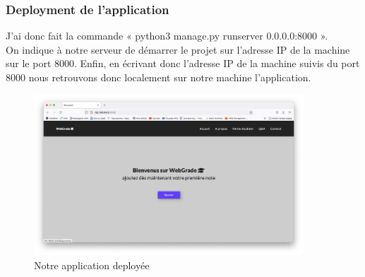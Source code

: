 \documentclass[12pt, a4paper]{article}
\begin{document}
            \subsubsection{Deployment de l'application}
            J’ai donc fait la commande « python3 manage.py runserver 0.0.0.0:8000 ». 
            \\On indique à notre serveur de démarrer le projet sur l’adresse IP de la machine sur le port 8000.
            Enfin, en écrivant donc l’adresse IP de la machine suivis du port 8000 nous retrouvons donc localement sur notre machine l’application. 
            \begin{figure}[h]
                \centering
                \includegraphics[width=0.9\textwidth]{dep.png}
                \caption{Notre application deployée}
                \label{fig:dep}
            \end{figure}

            

              
              
            
\end{document}

